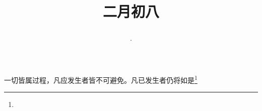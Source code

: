 \title{\date[d=17,m=3,y=2024][year:cn-y,年,month:cn,day:cn,日,·,weekday]·二月初八 }
一切皆属过程，凡应发生者皆不可避免。凡已发生者仍将如是\footnote{ }


